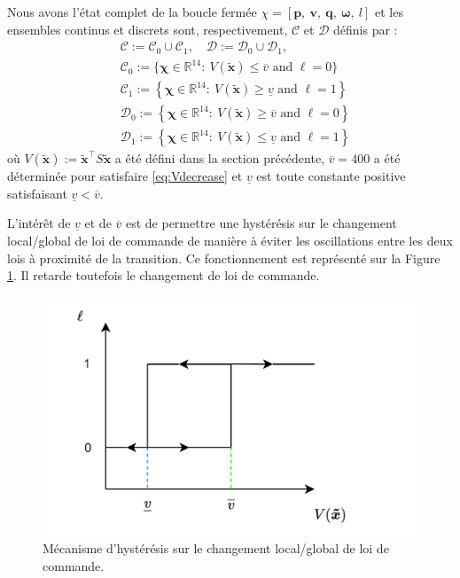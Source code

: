 Nous avons l'état complet de la boucle fermée $\chi = \left[\boldsymbol{p},~ \boldsymbol{v},~ \boldsymbol{q},~  \boldsymbol{\omega},~ l\right]$ et les ensembles continus et discrets sont, respectivement, $\mathcal{C}$ et $\mathcal{D}$ définis par :
\begin{align*}
    & \mathcal{C} := \mathcal{C}_{0} \cup \mathcal{C}_{1}, \quad \mathcal{D} := \mathcal{D}_{0} \cup \mathcal{D}_{1},\\
   & \mathcal{C}_{0} :=\{\boldsymbol{\chi} \in \mathbb{R}^{14}:~ V(\boldsymbol{\tilde x}) \le \overline{v} \mbox{ and } \ell=0\}\\
   & \mathcal{C}_{1} :=\left\{\boldsymbol{\chi} \in \mathbb{R}^{14}:~ V(\boldsymbol{\tilde x}) \ge \underline{v} \mbox{ and } \ell=1 \right\}\\
   & \mathcal{D}_{0} :=\left\{\boldsymbol{\chi} \in \mathbb{R}^{14}:~ V(\boldsymbol{\tilde x}) \geq \overline{v}\mbox{ and } \ell=0 \right\}\\
   & \mathcal{D}_{1} :=\left\{\boldsymbol{\chi} \in \mathbb{R}^{14}:~ V(\boldsymbol{\tilde x}) \leq \underline{v}\mbox{ and } \ell=1 \right\}
\end{align*}
où $V(\boldsymbol{\tilde x}) := \boldsymbol{\tilde x}^\top S \boldsymbol{\tilde x}$  a été défini dans la section précédente, $\overline{v}=400$ a été déterminée pour satisfaire \eqref{eq:Vdecrease} et $\underline{v}$ est toute constante positive satisfaisant $\underline{v}<\overline{v}$.

L'intérêt de $\underline{v}$ et de $\overline{v}$ est de permettre une hystérésis sur le changement local/global de loi de commande de manière à éviter les oscillations entre les deux lois à proximité de la transition. Ce fonctionnement est représenté sur la Figure \ref{fig:hysteresis}. Il retarde toutefois le changement de loi de commande.

\begin{figure}[ht!]
  \centering
  \includegraphics[trim=0cm 0cm 0cm 0cm,clip,width=0.8\columnwidth]{figures/hysteresis.png}
  \caption{Mécanisme d'hystérésis sur le changement local/global de loi de commande.}
  \label{fig:hysteresis}
\end{figure}

